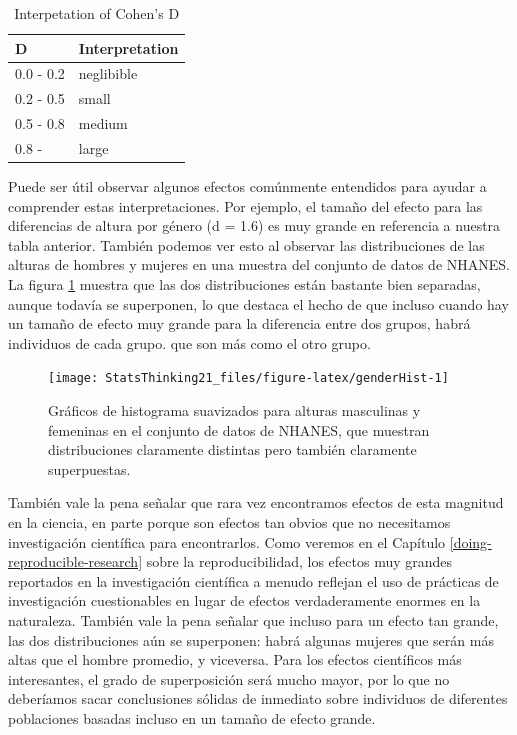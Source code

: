 \documentclass[
  12pt,
]{book}
\begin{document}
\begin{table}

\caption{\label{tab:unnamed-chunk-50}Interpetation of Cohen's D}
\centering
\begin{tabular}[t]{l|l}
\hline
D & Interpretation\\
\hline
0.0 - 0.2 & neglibible\\
\hline
0.2 - 0.5 & small\\
\hline
0.5 - 0.8 & medium\\
\hline
0.8 - & large\\
\hline
\end{tabular}
\end{table}

Puede ser útil observar algunos efectos comúnmente entendidos para ayudar a comprender estas interpretaciones. Por ejemplo, el tamaño del efecto para las diferencias de altura por género (d = 1.6) es muy grande en referencia a nuestra tabla anterior. También podemos ver esto al observar las distribuciones de las alturas de hombres y mujeres en una muestra del conjunto de datos de NHANES. La figura \ref{fig:genderHist} muestra que las dos distribuciones están bastante bien separadas, aunque todavía se superponen, lo que destaca el hecho de que incluso cuando hay un tamaño de efecto muy grande para la diferencia entre dos grupos, habrá individuos de cada grupo. que son más como el otro grupo.

\begin{figure}
\texttt{[image: StatsThinking21\_files/figure-latex/genderHist-1]} \caption{Gráficos de histograma suavizados para alturas masculinas y femeninas en el conjunto de datos de NHANES, que muestran distribuciones claramente distintas pero también claramente superpuestas.}\label{fig:genderHist}
\end{figure}

También vale la pena señalar que rara vez encontramos efectos de esta magnitud en la ciencia, en parte porque son efectos tan obvios que no necesitamos investigación científica para encontrarlos. Como veremos en el Capítulo \ref{doing-reproducible-research} sobre la reproducibilidad, los efectos muy grandes reportados en la investigación científica a menudo reflejan el uso de prácticas de investigación cuestionables en lugar de efectos verdaderamente enormes en la naturaleza. También vale la pena señalar que incluso para un efecto tan grande, las dos distribuciones aún se superponen: habrá algunas mujeres que serán más altas que el hombre promedio, y viceversa. Para los efectos científicos más interesantes, el grado de superposición será mucho mayor, por lo que no deberíamos sacar conclusiones sólidas de inmediato sobre individuos de diferentes poblaciones basadas incluso en un tamaño de efecto grande.
\end{document}
